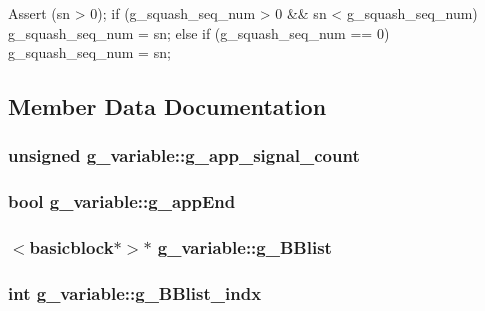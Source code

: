 \begin{DoxyCode}
                                 { 
        Assert (sn > 0);
        if (g_squash_seq_num > 0 && sn < g_squash_seq_num) {
            g_squash_seq_num = sn;
        } else if (g_squash_seq_num == 0) {
            g_squash_seq_num = sn;
        }
    }
\end{DoxyCode}


\subsection{Member Data Documentation}
\hypertarget{structg__variable_a8065e226bc2987122b831ffc1d58052a}{
\subsubsection[{g\_\-app\_\-signal\_\-count}]{\setlength{\rightskip}{0pt plus 5cm}unsigned {\bf g\_\-variable::g\_\-app\_\-signal\_\-count}}}
\label{structg__variable_a8065e226bc2987122b831ffc1d58052a}
\hypertarget{structg__variable_ac0ace8e752b855d8a33cd9c9a5d62511}{
\subsubsection[{g\_\-appEnd}]{\setlength{\rightskip}{0pt plus 5cm}bool {\bf g\_\-variable::g\_\-appEnd}}}
\label{structg__variable_ac0ace8e752b855d8a33cd9c9a5d62511}
\hypertarget{structg__variable_a1664c2b31146ab2b5f77464cd93f2cc8}{
\subsubsection[{g\_\-BBlist}]{$<${\bf basicblock}$\ast$$>$$\ast$ {\bf g\_\-variable::g\_\-BBlist}}}
\label{structg__variable_a1664c2b31146ab2b5f77464cd93f2cc8}
\hypertarget{structg__variable_a383af2308cefc8a72db47b1d7a41a702}{
\subsubsection[{g\_\-BBlist\_\-indx}]{\setlength{\rightskip}{0pt plus 5cm}int {\bf g\_\-variable::g\_\-BBlist\_\-indx}}}
